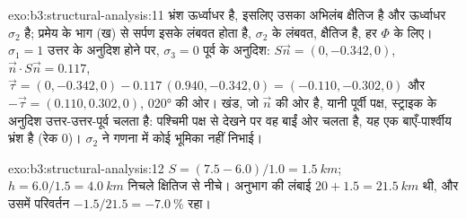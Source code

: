 \begin{solution}{exo:b3:structural-analysis:11}
भ्रंश ऊर्ध्वाधर है, इसलिए उसका अभिलंब क्षैतिज है और
ऊर्ध्वाधर $\sigma_2$ है; प्रमेय के भाग (ख) से सर्पण इसके लंबवत होता है,
$\sigma_2$ के लंबवत, क्षैतिज है, हर $\Phi$ के लिए। $\sigma_1 = 1$ उत्तर के अनुदिश होने पर,
$\sigma_3 = 0$ पूर्व के अनुदिश: $S\vec n = (0, -0.342, 0)$, $\vec n\cdot S\vec n =
0.117$, $\vec\tau = (0, -0.342, 0) - 0.117\,(0.940, -0.342, 0) = (-0.110,
-0.302, 0)$ और $-\vec\tau = (0.110, 0.302, 0)$, \ang{020} की ओर। खंड,
जो $\vec n$ की ओर है, यानी पूर्वी पक्ष, स्ट्राइक के अनुदिश उत्तर-उत्तर-पूर्व चलता है:
पश्चिमी पक्ष से देखने पर वह बाईं ओर चलता है, यह एक बाएँ-पार्श्वीय भ्रंश है (रेक
0)। $\sigma_2$ ने गणना में कोई भूमिका नहीं निभाई।
\end{solution}

\begin{solution}{exo:b3:structural-analysis:12}
$S = (7.5 - 6.0)/1.0 = \qty{1.5}{km}$; $h = 6.0/1.5 = \qty{4.0}{km}$ निचले
क्षितिज से नीचे। अनुभाग की लंबाई $20 + 1.5 = \qty{21.5}{km}$ थी, और उसमें परिवर्तन
$-1.5/21.5 = \qty{-7.0}{\percent}$ रहा।
\end{solution}

